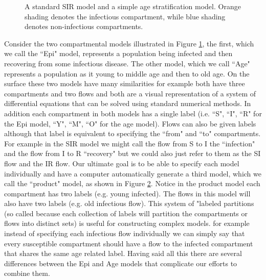 \FloatBarrier
\begin{figure}
    \centering
    
    \caption{A standard SIR model and a simple age stratification model. Orange shading denotes the infectious compartment, while blue shading denotes non-infectious compartments.}
    \label{fig:sir_age_strat}
\end{figure}

\begin{figure}
    \centering
    
    \caption{}
    \label{fig:simple_sir_age}
\end{figure}

Consider the two compartmental models illustrated in Figure \ref{fig:sir_age_strat}, the first, which we call the ``Epi" model, represents a population being infected and then recovering from some infectious disease. The other model, which we call ``Age" represents a population as it young to middle age and then to old age. On the surface these two models have many similarities for example both have three compartments and two flows and both are a visual representation of a system of differential equations that can be solved using standard numerical methods. In addition each compartment in both models has a single label (i.e. ``S", ``I", ``R" for the Epi model, ``Y", ``M", ``O" for the age model).  Flows can also be given labels although that label is equivalent to specifying the ``from" and ``to" compartments. For example in the SIR model we might call the flow from S to I the ``infection" and the flow from I to R ``recovery" but we could also just refer to them as the SI flow and the IR flow. Our ultimate goal is to be able to specify each model individually and have a computer automatically generate a third model, which we call the ``product" model, as shown in Figure \ref{fig:simple_sir_age}. Notice in the product model each compartment has two labels (e.g. young infected). The flows in this model will also have two labels (e.g. old infectious flow). This system of "labeled partitions (so called because each collection of labels will partition the compartments or flows into distinct sets) is useful for constructing complex models. for example instead of specifying each infectious flow individually we can simply say that every susceptible compartment should have a flow to the infected compartment that shares the same age related label. Having said all this there are several differences between the Epi and Age models that complicate our efforts to combine them.

